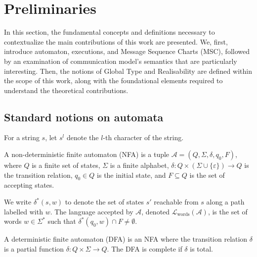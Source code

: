 \chapter{Preliminaries}\label{sec:pre}
In this section, the fundamental concepts and definitions necessary 
to contextualize the main contributions of this work are presented. 
We, first, introduce automaton, executions, and
Message Sequence Charts (MSC), followed by 
an examination of communication model's semantics that are particularly 
interesting. 
Then, the notions of Global Type and Realisability are 
defined within the scope of this work, along with the foundational 
elements required to understand the theoretical contributions.

\section{Standard notions on automata}
For a string $s$, let $s^l$ denote the $l$-th character of the string.

\bigskip

\begin{definition}[NFA]\label{def:nfa}
A non-deterministic finite automaton (NFA) is a tuple  
$\mathcal{A} = (Q, \Sigma, \delta, q_0, F)$, where $Q$ is a finite set of  
states, $\Sigma$ is a finite alphabet,  
$\delta : Q \times (\Sigma \cup \{\varepsilon\}) \to Q$ is the transition  
relation, $q_0 \in Q$ is the initial state, and $F \subseteq Q$ is the set  
of accepting states.  

We write $\delta^*(s,w)$ to denote the set of states $s'$ reachable from  
$s$ along a path labelled with $w$. The language accepted by $\mathcal{A}$,  
denoted $\mathcal{L}_{\text{words}}(\mathcal{A})$, is the set of words  
$w \in \Sigma^*$ such that $\delta^*(q_0,w) \cap F \neq \emptyset$.  
\end{definition}

\bigskip

\begin{definition}[DFA]\label{def:dfa}
A deterministic finite automaton (DFA) is an NFA where the transition  
relation $\delta$ is a partial function  
$\delta : Q \times \Sigma \to Q$. The DFA is complete if $\delta$ is  
total.  

\end{definition}

